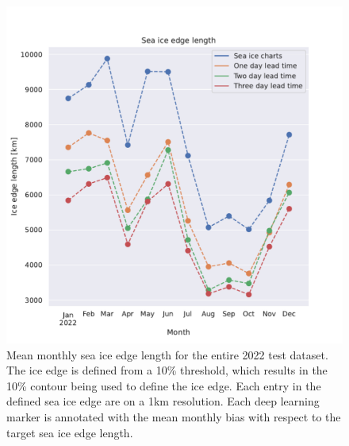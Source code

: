 \documentclass[../main/thesis.tex]{subfiles}
\begin{document}
\begin{figure}
    \centering
    \includegraphics[width=\textwidth]{ice_edge_length}
    \caption{\label{fig:ice-edge-length}Mean monthly sea ice edge length for the entire 2022 test dataset. The ice edge is defined from a 10\% threshold, which results in the 10\% contour being used to define the ice edge. Each entry in the defined sea ice edge are on a 1km resolution. Each deep learning marker is annotated with the mean monthly bias with respect to the target sea ice edge length.}
\end{figure}


\end{document}
